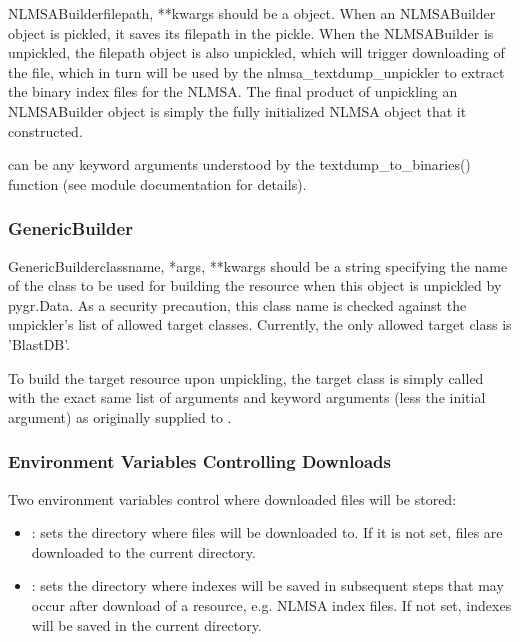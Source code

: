 \documentclass{howto}
\begin{document}
\begin{funcdesc}{NLMSABuilder}{filepath, **kwargs}
   should be a  object.  When an NLMSABuilder
  object is pickled, it saves its filepath in the pickle.  When 
  the NLMSABuilder is unpickled, the filepath object is also unpickled,
  which will trigger downloading of the  file, 
  which in turn will be used by the nlmsa_textdump_unpickler
  to extract the binary index files for the NLMSA.  The final product
  of unpickling an NLMSABuilder object is simply the fully initialized
  NLMSA object that it constructed.

   can be any keyword arguments understood by the
  textdump_to_binaries() function (see  module
  documentation for details).
\end{funcdesc}

\subsubsection{GenericBuilder}
\begin{funcdesc}{GenericBuilder}{classname, *args, **kwargs}
   should be a string specifying the name of
  the class to be used for building the resource when this
  object is unpickled by pygr.Data.  As a security precaution,
  this class name is checked against the unpickler's list of
  allowed target classes.  Currently, the only 
  allowed target class is 'BlastDB'.

  To build the target resource upon unpickling, the
  target class is simply called with the exact same list
  of arguments and keyword arguments (less the initial 
  argument) as originally supplied to .
\end{funcdesc}

\subsubsection{Environment Variables Controlling Downloads}
Two environment variables control where downloaded files will be
stored:
\begin{itemize}
\item {}: sets the directory where files will
be downloaded to.  If it is not set, files are downloaded to the current
directory.

\item {}: sets the directory where indexes will
be saved in subsequent steps that may occur after download of
a resource, e.g. NLMSA index files.  If not set, indexes will be
saved in the current directory.
\end{itemize}
\end{document}
